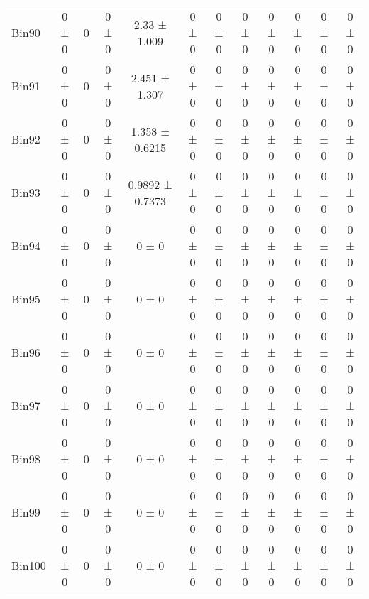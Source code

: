 \begin{tabular}{@{\extracolsep{4pt}}lccccccccccc@{}}
     Bin90 & 0 ± 0 & 0 & 0 ± 0 & 2.33 ± 1.009 & 0 ± 0 & 0 ± 0 & 0 ± 0 & 0 ± 0 & 0 ± 0 & 0 ± 0 & 0 ± 0 \\ 
     Bin91 & 0 ± 0 & 0 & 0 ± 0 & 2.451 ± 1.307 & 0 ± 0 & 0 ± 0 & 0 ± 0 & 0 ± 0 & 0 ± 0 & 0 ± 0 & 0 ± 0 \\ 
     Bin92 & 0 ± 0 & 0 & 0 ± 0 & 1.358 ± 0.6215 & 0 ± 0 & 0 ± 0 & 0 ± 0 & 0 ± 0 & 0 ± 0 & 0 ± 0 & 0 ± 0 \\ 
     Bin93 & 0 ± 0 & 0 & 0 ± 0 & 0.9892 ± 0.7373 & 0 ± 0 & 0 ± 0 & 0 ± 0 & 0 ± 0 & 0 ± 0 & 0 ± 0 & 0 ± 0 \\ 
     Bin94 & 0 ± 0 & 0 & 0 ± 0 & 0 ± 0 & 0 ± 0 & 0 ± 0 & 0 ± 0 & 0 ± 0 & 0 ± 0 & 0 ± 0 & 0 ± 0 \\ 
     Bin95 & 0 ± 0 & 0 & 0 ± 0 & 0 ± 0 & 0 ± 0 & 0 ± 0 & 0 ± 0 & 0 ± 0 & 0 ± 0 & 0 ± 0 & 0 ± 0 \\ 
     Bin96 & 0 ± 0 & 0 & 0 ± 0 & 0 ± 0 & 0 ± 0 & 0 ± 0 & 0 ± 0 & 0 ± 0 & 0 ± 0 & 0 ± 0 & 0 ± 0 \\ 
     Bin97 & 0 ± 0 & 0 & 0 ± 0 & 0 ± 0 & 0 ± 0 & 0 ± 0 & 0 ± 0 & 0 ± 0 & 0 ± 0 & 0 ± 0 & 0 ± 0 \\ 
     Bin98 & 0 ± 0 & 0 & 0 ± 0 & 0 ± 0 & 0 ± 0 & 0 ± 0 & 0 ± 0 & 0 ± 0 & 0 ± 0 & 0 ± 0 & 0 ± 0 \\ 
     Bin99 & 0 ± 0 & 0 & 0 ± 0 & 0 ± 0 & 0 ± 0 & 0 ± 0 & 0 ± 0 & 0 ± 0 & 0 ± 0 & 0 ± 0 & 0 ± 0 \\ 
     Bin100 & 0 ± 0 & 0 & 0 ± 0 & 0 ± 0 & 0 ± 0 & 0 ± 0 & 0 ± 0 & 0 ± 0 & 0 ± 0 & 0 ± 0 & 0 ± 0 \\ 
\hline\hline
  \end{tabular}
